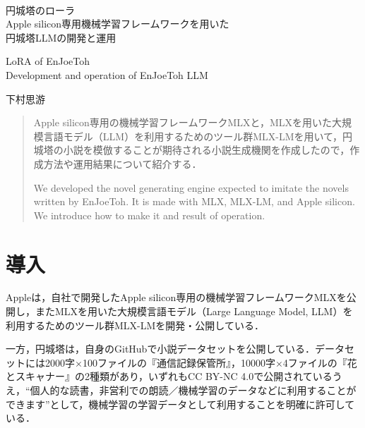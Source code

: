 \documentclass[10pt, a5paper, twoside]{jsarticle}
\theoremstyle{definition}
\begin{document}
	~ %

	\begin{center}

		\Large{円城塔のローラ \\ Apple silicon専用機械学習フレームワークを用いた \\ 円城塔LLMの開発と運用}

		\vspace{3mm}

		\large{LoRA of EnJoeToh \\ Development and operation of EnJoeToh LLM}

		\vspace{3mm}
		
		\large{下村思游}

	\end{center}

	\vspace{3mm}

	\begin{abstract}

		Apple silicon専用の機械学習フレームワークMLXと，MLXを用いた大規模言語モデル（LLM）を利用するためのツール群MLX-LMを用いて，円城塔の小説を模倣することが期待される小説生成機関を作成したので，作成方法や運用結果について紹介する．

		\vspace{3mm}

		We developed the novel generating engine expected to imitate the novels written by EnJoeToh. It is made with MLX, MLX-LM, and Apple silicon. We introduce how to make it and result of operation.

	\end{abstract}

	\section{導入}

		Appleは，自社で開発したApple silicon専用の機械学習フレームワークMLXを公開し，またMLXを用いた大規模言語モデル（Large Language Model, LLM）を利用するためのツール群MLX-LMを開発・公開している．

		一方，円城塔は，自身のGitHubで小説データセットを公開している．データセットには2000字$\times$100ファイルの『通信記録保管所』\cite{storage}，10000字$\times$4ファイルの『花とスキャナー』\cite{scanner}の2種類があり，いずれもCC BY-NC 4.0で公開されているうえ，“個人的な読書，非営利での朗読／機械学習のデータなどに利用することができます”として，機械学習の学習データとして利用することを明確に許可している．
\end{document}
